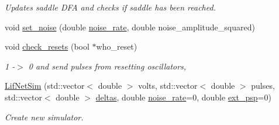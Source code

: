 \begin{DoxyCompactItemize}
\begin{DoxyCompactList}\small\item\em Updates saddle D\-F\-A and checks if saddle has been reached. \end{DoxyCompactList}\item 
void \hyperlink{classLifNetSim_a6ec30e0006b7e3cac12299061f86916f}{set\-\_\-noise} (double \hyperlink{classLifNetSim_aa4075d2e5e5432a5e058c4fd7997bbea}{noise\-\_\-rate}, double noise\-\_\-amplitude\-\_\-squared)
\item 
\hypertarget{classLifNetSim_a7a3e379a13b36caa6de19cb4aeb7ea5c}{void \hyperlink{classLifNetSim_a7a3e379a13b36caa6de19cb4aeb7ea5c}{check\-\_\-resets} (bool $\ast$who\-\_\-reset)}\label{classLifNetSim_a7a3e379a13b36caa6de19cb4aeb7ea5c}

\begin{DoxyCompactList}\small\item\em 1 -\/$>$ 0 and send pulses from resetting oscillators, \end{DoxyCompactList}\item 
\hypertarget{classLifNetSim_a488066378c2438a315032b3152d158a9}{\hyperlink{classLifNetSim_a488066378c2438a315032b3152d158a9}{Lif\-Net\-Sim} (std\-::vector$<$ double $>$ volts, std\-::vector$<$ double $>$ pulses, std\-::vector$<$ double $>$ \hyperlink{classLifNetSim_a4281a22581bec2e098e0b9f81ac3e6c7}{deltas}, double \hyperlink{classLifNetSim_aa4075d2e5e5432a5e058c4fd7997bbea}{noise\-\_\-rate}=0, double \hyperlink{classLifNetSim_a4fd0ebbe8a95e62430b3054ffe564662}{ext\-\_\-psp}=0)}\label{classLifNetSim_a488066378c2438a315032b3152d158a9}

\begin{DoxyCompactList}\small\item\em Create new simulator. \end{DoxyCompactList}\end{DoxyCompactItemize}
